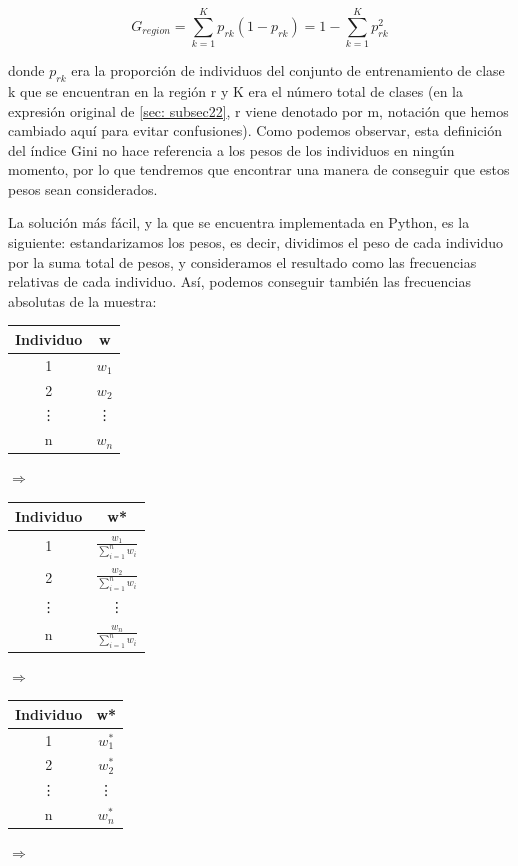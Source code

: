 \documentclass[12pt,twoside]{article}
\begin{document}
\begin{equation*}
G_{region} = \sum_{k=1}^K p_{rk}(1 - p_{rk}) = 1 - \sum_{k=1}^K p_{rk}^2
\end{equation*}

\noindent
donde $p_{rk}$ era la proporción de individuos del conjunto de entrenamiento de clase k que se encuentran en la región r y K era el número total de clases (en la expresión original de \ref{sec: subsec22}, r viene denotado por m, notación que hemos cambiado aquí para evitar confusiones). Como podemos observar, esta definición del índice Gini no hace referencia a los pesos de los individuos en ningún momento, por lo que tendremos que encontrar una manera de conseguir que estos pesos sean considerados.

La solución más fácil, y la que se encuentra implementada en Python, es la siguiente: estandarizamos los pesos, es decir, dividimos el peso de cada individuo por la suma total de pesos, y consideramos el resultado como las frecuencias relativas de cada individuo. Así, podemos conseguir también las frecuencias absolutas de la muestra:
\begin{center}
\begin{tabular}{|c|c|}
\hline
Individuo & w \\ \hline
1 & $w_1$ \\ \hline
2 & $w_2$ \\ \hline
\vdots & \vdots \\ \hline
n & $w_n$ \\ \hline
\end{tabular}
$\Rightarrow$
\begin{tabular}{|c|c|}
\hline
Individuo & w* \\ \hline
1 & $\frac{w_1}{\sum_{i=1}^n w_i}$ \\ \hline
2 & $\frac{w_2}{\sum_{i=1}^n w_i}$ \\ \hline
\vdots & \vdots \\ \hline
n & $\frac{w_n}{\sum_{i=1}^n w_i}$ \\ \hline
\end{tabular}
$\Rightarrow$
\begin{tabular}{|c|c|}
\hline
Individuo & w* \\ \hline
1 & $w_1^*$ \\ \hline
2 & $w_2^*$ \\ \hline
\vdots & \vdots \\ \hline
n & $w_n^*$ \\ \hline
\end{tabular}
$\Rightarrow$
\end{center}
\end{document}
